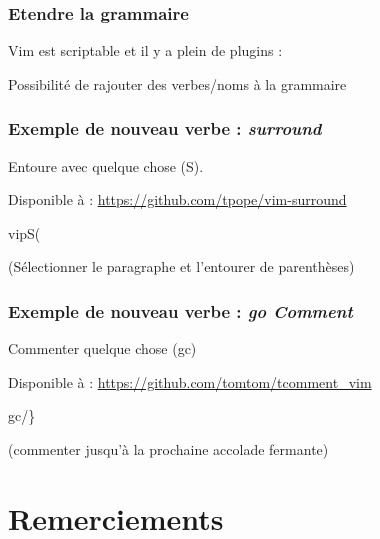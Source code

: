 \documentclass{beamer}
\begin{document}
\begin{frame}
\frametitle{Etendre la grammaire}

Vim est \alert{scriptable} et il y a \alert{plein de plugins} :

\begin{center}
Possibilité de rajouter des verbes/noms à la grammaire
\end{center}
\end{frame}

\begin{frame}
\frametitle{Exemple de nouveau verbe : {\it surround}}

Entoure avec quelque chose (\alert{S}).

Disponible à : \url{https://github.com/tpope/vim-surround}

\pause{}
\begin{center}
    vipS(
    \pause{}

    (Sélectionner le paragraphe et l'entourer de parenthèses)
\end{center}
\end{frame}


\begin{frame}
\frametitle{Exemple de nouveau verbe : {\it go Comment}}

Commenter quelque chose (\alert{gc})

Disponible à : \url{https://github.com/tomtom/tcomment_vim}
\pause{}

\begin{center}
		\alert{gc/\}}
    \pause{}

    (commenter jusqu'à la prochaine accolade fermante)
\end{center}
    
\end{frame}

\section{Remerciements}
\subsection{}
\frame{\tableofcontents[currentsection]}
\end{document}
